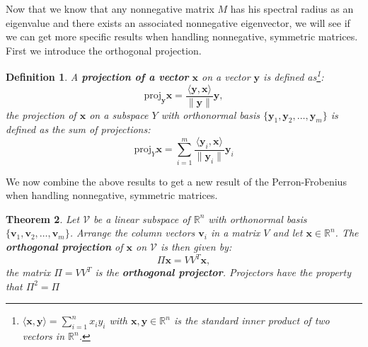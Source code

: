 \documentclass[a4paper,11pt]{report}
\newtheorem{theorem}{Theorem}[section]
\newtheorem{definition}[theorem]{Definition}
\newcommand{\R}{{\mathbb R}}
\begin{document}
Now that we know that any nonnegative matrix $M$ has his spectral radius as an 
eigenvalue and there exists an associated nonnegative eigenvector, we will see 
if we can get more specific results when handling nonnegative, symmetric 
matrices. First we introduce the orthogonal projection. 
\begin{definition}
  A \textbf{projection of a vector} $\mathbf{x}$ on a vector $\mathbf{y}$ is defined as\footnote{$\langle \mathbf{x}, \mathbf{y}\rangle = \sum_{i=1}^n x_i y_i$ with $\mathbf{x},\mathbf{y}\in \R^n$ is the standard inner product of  two vectors in $\R^n$.}:
  $$\text{proj}_\mathbf{y}\mathbf{x} = \frac{ \langle\mathbf{y},\mathbf{x} \rangle}{\|\mathbf{y}\|}\mathbf{y},$$
  the projection of $\mathbf{x}$ on a subspace $Y$ with orthonormal basis $\{\mathbf{y}_1, \mathbf{y}_2, \ldots, \mathbf{y}_m\}$ 
  is defined as the sum of projections:
  $$\text{proj}_Y\mathbf{x} = \sum_{i=1}^{m} \frac{ \langle\mathbf{y}_i,\mathbf{x} \rangle}{\|\mathbf{y}_i\|}\mathbf{y}_i$$

\end{definition}
We now combine the above results to get a new result of the Perron-Frobenius 
when handling nonnegative, symmetric matrices.
\begin{theorem}
  Let $\mathcal{V}$ be a linear subspace of $\R^n$ with orthonormal basis $\{\mathbf{v}_1, \mathbf{v}_2, \ldots, \mathbf{v}_m\}$.
  Arrange the column vectors $\mathbf{v}_i$ in a matrix $V$ and let $\mathbf{x} \in \R^n$. The 
  \textbf{orthogonal projection} of $\mathbf{x}$ on  $\mathcal{V}$ is then given by:
  $$\Pi\mathbf{x} = VV^T\mathbf{x},$$
  the matrix $\Pi = VV^T$ is the \textbf{orthogonal projector}. Projectors have 
  the property that $\Pi^2 = \Pi$
\end{theorem}
\end{document}
